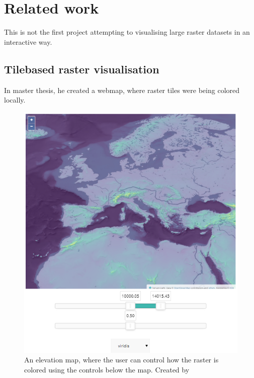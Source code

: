 \chapter{Related work}\label{CRelatedWork}

This is not the first project attempting to visualising large raster datasets in an interactive way. 

\section{Tilebased raster visualisation}
In \citet{Baumrocks} master thesis, he created a webmap, where raster tiles were being colored locally. 

\begin{figure} [H]
	\centering
	\includegraphics[width=.6\textwidth]{Pictures/BaumrockMap1}
	\caption{An elevation map, where the user can control how the raster is colored using the controls below the map. Created by \citep{EOX}}
	\label{BaumrockMap1}
\end{figure}

